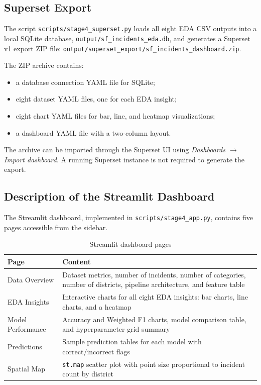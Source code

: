 \documentclass[12pt,a4paper]{article}
\begin{document}
\subsection{Superset Export}

The script \texttt{scripts/stage4\_superset.py} loads all eight EDA CSV outputs into a local SQLite database, \texttt{output/sf\_incidents\_eda.db}, and generates a Superset v1 export ZIP file: \texttt{output/superset\_export/sf\_incidents\_dashboard.zip}.

The ZIP archive contains:
\begin{itemize}
    \item a database connection YAML file for SQLite;
    \item eight dataset YAML files, one for each EDA insight;
    \item eight chart YAML files for bar, line, and heatmap visualizations;
    \item a dashboard YAML file with a two-column layout.
\end{itemize}

The archive can be imported through the Superset UI using \textit{Dashboards $\rightarrow$ Import dashboard}. A running Superset instance is not required to generate the export.

\subsection{Description of the Streamlit Dashboard}

The Streamlit dashboard, implemented in \texttt{scripts/stage4\_app.py}, contains five pages accessible from the sidebar.

\begin{table}[H]
\centering
\caption{Streamlit dashboard pages}
\begin{tabular}{L{5cm} L{10cm}}
\toprule
\textbf{Page} & \textbf{Content} \\
\midrule
Data Overview & Dataset metrics, number of incidents, number of categories, number of districts, pipeline architecture, and feature table \\
EDA Insights & Interactive charts for all eight EDA insights: bar charts, line charts, and a heatmap \\
Model Performance & Accuracy and Weighted F1 charts, model comparison table, and hyperparameter grid summary \\
Predictions & Sample prediction tables for each model with correct/incorrect flags \\
Spatial Map & \texttt{st.map} scatter plot with point size proportional to incident count by district \\
\bottomrule
\end{tabular}
\end{table}
\end{document}
